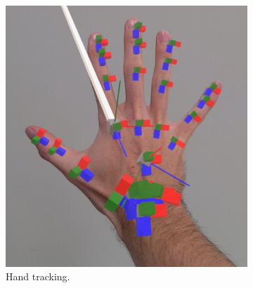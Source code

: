 \begin{figure}[H]
    \centering
    \begin{subfigure}{0.45\textwidth}
        \centering
        \includegraphics[width=\textwidth]{images/hand-tracking.jpg}
        \caption{Hand tracking.}
        \label{fig:figure24a}
    \end{subfigure}
    \begin{subfigure}{0.4\textwidth}
        \centering

\end{subfigure}
\end{figure}
